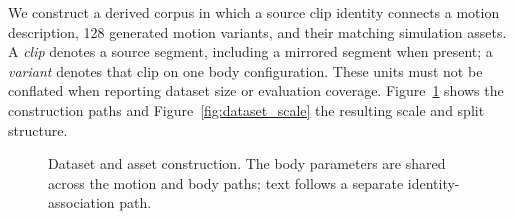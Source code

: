 \documentclass[11pt]{article}
\begin{document}
We construct a derived corpus in which a source clip identity connects a motion
description, 128 generated motion variants, and their matching simulation
assets. A \emph{clip} denotes a source segment, including a mirrored segment
when present; a \emph{variant} denotes that clip on one body configuration.
These units must not be conflated when reporting dataset size or evaluation
coverage. Figure~\ref{fig:data_pipeline} shows the construction paths and
Figure~\ref{fig:dataset_scale} the resulting scale and split structure.

\begin{figure}[t]
\centering
{}
\caption{Dataset and asset construction. The body parameters are shared across
the motion and body paths; text follows a separate identity-association path.}\label{fig:data_pipeline}
\end{figure}
\end{document}
